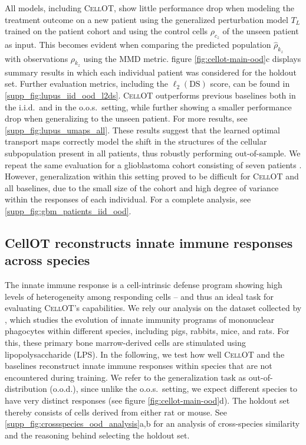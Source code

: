 All models, including \textsc{CellOT}, show little performance drop when modeling the treatment outcome on a new patient using the generalized perturbation model $T_L$ trained on the patient cohort and using the control cells $\rho_{c_z}$ of the unseen patient as input.
This becomes evident when comparing the predicted population $\hat{\rho}_{k_z}$ with observations $\rho_{k_z}$ using the MMD metric. figure \ref{fig:cellot-main-ood}c displays summary results in which each individual patient was considered for the holdout set.
Further evaluation metrics, including the $\ell_2(\text{DS})$ score, can be found in \ref{supp_fig:lupus_iid_ood_l2ds}.
\textsc{CellOT} outperforms previous baselines both in the i.i.d.~and in the o.o.s.~setting, while further showing a smaller performance drop when generalizing to the unseen patient.
For more results, see \ref{supp_fig:lupus_umaps_all}.
These results suggest that the learned optimal transport maps correctly model the shift in the structures of the cellular subpopulation present in all patients, thus robustly performing out-of-sample.
We repeat the same evaluation for a glioblastoma cohort consisting of seven patients \cite{zhao2021deconvolution}.
However, generalization within this setting proved to be difficult for \textsc{CellOT} and all baselines, due to the small size of the cohort and high degree of variance within the responses of each individual. 
For a complete analysis, see \ref{supp_fig:gbm_patients_iid_ood}.

\subsection{CellOT reconstructs innate immune responses across species}

The innate immune response is a cell-intrinsic defense program showing high levels of heterogeneity among responding cells -- and thus an ideal task for evaluating \textsc{CellOT}'s capabilities.
We rely our analysis on the dataset collected by \citet{hagai2018gene}, which studies the evolution of innate immunity programs of mononuclear phagocytes within different species, including pigs, rabbits, mice, and rats.
For this, these primary bone marrow-derived cells are stimulated using lipopolysaccharide (LPS).
In the following, we test how well \textsc{CellOT} and the baselines reconstruct innate immune responses within species that are not encountered during training.
We refer to the generalization task as out-of-distribution (o.o.d.), since unlike the o.o.s.~setting, we expect different species to have very distinct responses (see figure \ref{fig:cellot-main-ood}d).
The holdout set thereby consists of cells derived from either rat or mouse. See \ref{supp_fig:crossspecies_ood_analysis}a,b for an analysis of cross-species similarity and the reasoning behind selecting the holdout set.

